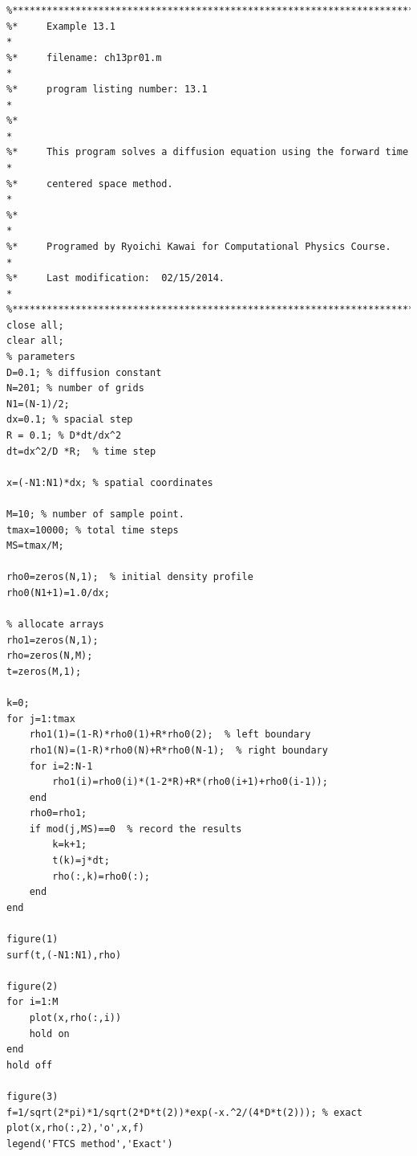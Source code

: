 \noindent
\program
\label{prog:diffusion}
\footnotesize
\begin{verbatim}
%**************************************************************************
%*     Example 13.1                                                       *
%*     filename: ch13pr01.m                                               *
%*     program listing number: 13.1                                       *
%*                                                                        *
%*     This program solves a diffusion equation using the forward time    *
%*     centered space method.                                             *
%*                                                                        *
%*     Programed by Ryoichi Kawai for Computational Physics Course.       *
%*     Last modification:  02/15/2014.                                    *
%**************************************************************************
close all;
clear all;
% parameters
D=0.1; % diffusion constant
N=201; % number of grids
N1=(N-1)/2;
dx=0.1; % spacial step
R = 0.1; % D*dt/dx^2
dt=dx^2/D *R;  % time step

x=(-N1:N1)*dx; % spatial coordinates

M=10; % number of sample point.
tmax=10000; % total time steps
MS=tmax/M;

rho0=zeros(N,1);  % initial density profile
rho0(N1+1)=1.0/dx;

% allocate arrays
rho1=zeros(N,1);
rho=zeros(N,M);
t=zeros(M,1);

k=0;
for j=1:tmax
    rho1(1)=(1-R)*rho0(1)+R*rho0(2);  % left boundary
    rho1(N)=(1-R)*rho0(N)+R*rho0(N-1);  % right boundary
    for i=2:N-1
        rho1(i)=rho0(i)*(1-2*R)+R*(rho0(i+1)+rho0(i-1));
    end
    rho0=rho1;
    if mod(j,MS)==0  % record the results
        k=k+1;
        t(k)=j*dt;
        rho(:,k)=rho0(:);
    end
end

figure(1)
surf(t,(-N1:N1),rho)
    
figure(2)
for i=1:M
    plot(x,rho(:,i))
    hold on
end
hold off

figure(3)
f=1/sqrt(2*pi)*1/sqrt(2*D*t(2))*exp(-x.^2/(4*D*t(2))); % exact
plot(x,rho(:,2),'o',x,f)
legend('FTCS method','Exact')
\end{verbatim}
\normalsize

